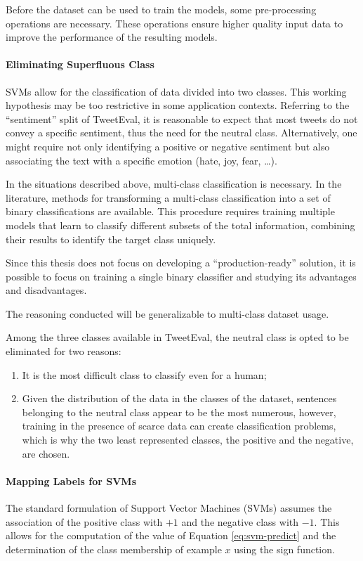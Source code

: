 Before the dataset can be used to train the models, some pre-processing operations are necessary. These operations ensure higher quality input data to improve the performance of the resulting models.

\paragraph{Eliminating Superfluous Class} SVMs allow for the classification of data divided into two classes. This working hypothesis may be too restrictive in some application contexts. Referring to the ``sentiment'' split of TweetEval, it is reasonable to expect that most tweets do not convey a specific sentiment, thus the need for the neutral class. Alternatively, one might require not only identifying a positive or negative sentiment but also associating the text with a specific emotion (hate, joy, fear, \dots).

In the situations described above, multi-class classification is necessary. In the literature, methods for transforming a multi-class classification into a set of binary classifications are available\cite{multiclass}. This procedure requires training multiple models that learn to classify different subsets of the total information, combining their results to identify the target class uniquely. 

Since this thesis does not focus on developing a ``production-ready'' solution, it is possible to focus on training a single binary classifier and studying its advantages and disadvantages. 

The reasoning conducted will be generalizable to multi-class dataset usage.

Among the three classes available in TweetEval, the neutral class is opted to be eliminated for two reasons:
\begin{enumerate}
    \item It is the most difficult class to classify even for a human;
    \item Given the distribution of the data in the classes of the dataset, sentences belonging to the neutral class appear to be the most numerous, however, training in the presence of scarce data can create classification problems, which is why the two least represented classes, the positive and the negative, are chosen.
\end{enumerate}

\paragraph{Mapping Labels for SVMs} The standard formulation of Support Vector Machines (SVMs) assumes the association of the positive class with $+1$ and the negative class with $-1$. This allows for the computation of the value of Equation \ref{eq:svm-predict} and the determination of the class membership of example $x$ using the sign function.

